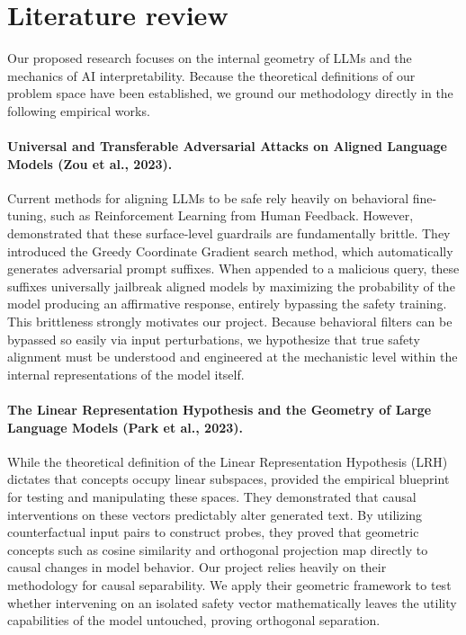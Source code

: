 \section{Literature review}

Our proposed research focuses on the internal geometry of LLMs and the mechanics of AI interpretability. Because the theoretical definitions of our problem space have been established, we ground our methodology directly in the following empirical works.

\paragraph{Universal and Transferable Adversarial Attacks on Aligned Language Models (Zou et al., 2023).}
Current methods for aligning LLMs to be safe rely heavily on behavioral fine-tuning, such as Reinforcement Learning from Human Feedback. However, \citet{zou2023gcg} demonstrated that these surface-level guardrails are fundamentally brittle. They introduced the Greedy Coordinate Gradient search method, which automatically generates adversarial prompt suffixes. When appended to a malicious query, these suffixes universally jailbreak aligned models by maximizing the probability of the model producing an affirmative response, entirely bypassing the safety training. This brittleness strongly motivates our project. Because behavioral filters can be bypassed so easily via input perturbations, we hypothesize that true safety alignment must be understood and engineered at the mechanistic level within the internal representations of the model itself.

\paragraph{The Linear Representation Hypothesis and the Geometry of Large Language Models (Park et al., 2023).}
While the theoretical definition of the Linear Representation Hypothesis (LRH) dictates that concepts occupy linear subspaces, \citet{park2023LRH} provided the empirical blueprint for testing and manipulating these spaces. They demonstrated that causal interventions on these vectors predictably alter generated text. By utilizing counterfactual input pairs to construct probes, they proved that geometric concepts such as cosine similarity and orthogonal projection map directly to causal changes in model behavior. Our project relies heavily on their methodology for causal separability. We apply their geometric framework to test whether intervening on an isolated safety vector mathematically leaves the utility capabilities of the model untouched, proving orthogonal separation.

